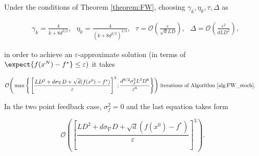         \begin{corollary}
        \label{cor:FW}
            Under the conditions of Theorem \ref{theorem:FW}, choosing $\gamma_k, \eta_k, \tau, \Delta$ as

            \begin{equation*}
            \begin{split}
                &\gamma_k = \frac{4}{k + 8d^{3/2}}, \text{ }
                \eta_k = \frac{4}{(k + 8d^{3/2})^{2/3}}, \text{ }
                \tau = \mathcal{O} \left(\frac{\varepsilon}{\sqrt{d} L D} \right), \text{ }
                \Delta = \mathcal{O} \left( \frac{\varepsilon^2}{d L D^2}\right),
            \end{split}
            \end{equation*}

            in order to achieve an $\varepsilon$-approximate solution (in terms of $\expect{f(x^N) - f^*} \leq \varepsilon)$ it takes
            
            \begin{equation*}
            \begin{split}
                &\mathcal{O} \Bigg( \max\Bigg\{ \left[ \frac{L D^2 + d\sigma_{\nabla} D + \sqrt{d} (f(x^0) - f^*)}{\varepsilon}\right]^3; 
                \frac{d^{9/2} \sigma_f^3 L^3D^6}{\varepsilon^6} \Bigg\}\Bigg) \text{ iterations of Algorithm \ref{alg:FW_stoch}.}
            \end{split}
            \end{equation*}

            In the two point feedback case, $\sigma_f^2 = 0$ and the last equation takes form
            
            \begin{equation*}
                \mathcal{O} \left( \left[ \frac{L D^2 + d\sigma_{\nabla} D + \sqrt{d} (f(x^0) - f^*)}{\varepsilon}\right]^3 \right).
            \end{equation*}
        \end{corollary}


